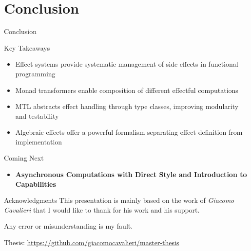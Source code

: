 \documentclass[presentation, 10pt]{beamer}\mode<presentation>{\usetheme{metropolis}}
\begin{document}
\section{Conclusion}
\begin{frame}{Conclusion}
	\begin{alertblock}{Key Takeaways}
		\begin{itemize}
			\item Effect systems provide systematic management of side effects in functional programming
			\item Monad transformers enable composition of different effectful computations
			\item MTL abstracts effect handling through type classes, improving modularity and testability
			\item Algebraic effects offer a powerful formalism separating effect definition from implementation
		\end{itemize}
	\end{alertblock}
	
	\begin{exampleblock}{Coming Next}
		\begin{itemize}
		\item 
		\textbf{Asynchronous Computations with Direct Style and Introduction to Capabilities}
		\end{itemize}
	\end{exampleblock}
\end{frame}
\frame{\titlepage}


\begin{frame}{Acknowledgments}
	This presentation is mainly based on the work of \emph{Giacomo Cavalieri} that I would like to thank for his work and his support.
	
	Any error or misunderstanding is my fault.

	Thesis: \url{https://github.com/giacomocavalieri/master-thesis}
\end{frame}


\end{document}

